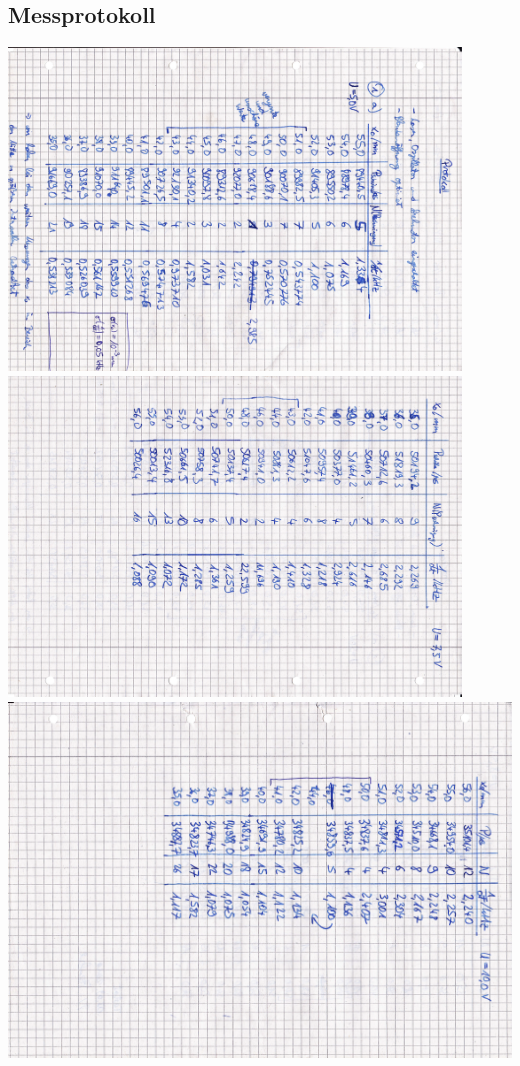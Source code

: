 \begin{appendix}
\section{Messprotokoll}

\centering \includegraphics[width=0.9\textwidth]{Bilder/Protokoll/01.pdf}
\centering \includegraphics[width=0.9\textwidth]{Bilder/Protokoll/02.pdf}
\centering \includegraphics[width=\textwidth]{Bilder/Protokoll/03.pdf}

\end{appendix}
